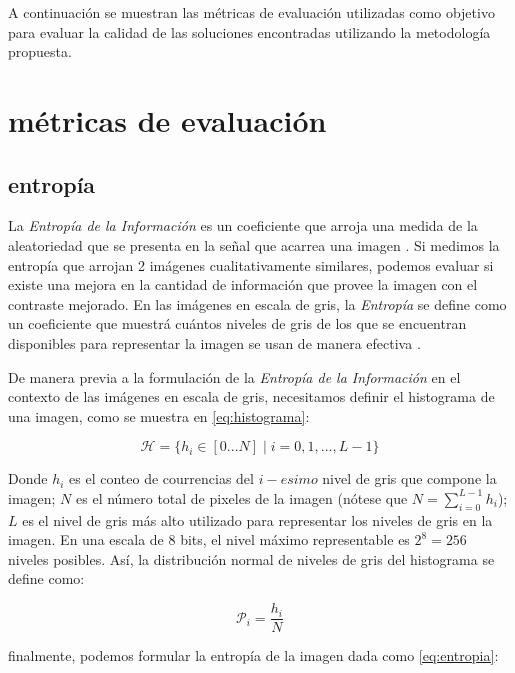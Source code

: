 \documentclass[spanish]{article}
\begin{document}
A continuación se muestran las métricas de evaluación utilizadas como objetivo para evaluar la calidad de las soluciones encontradas utilizando la metodología propuesta.

\section{métricas de evaluación}
\label{sec:metricas}

\subsection{entropía}
\label{ssec:entropia}

La {\it Entropía de la Información} es un coeficiente que arroja una medida de la aleatoriedad que se presenta en la señal que acarrea una imagen \cite{tsai2008information}. Si medimos la entropía que arrojan 2 imágenes cualitativamente similares, podemos evaluar si existe una mejora en la cantidad de información que provee la imagen con el contraste mejorado. En las imágenes en escala de gris, la {\it Entropía} se define como un coeficiente que muestrá cuántos niveles de gris de los que se encuentran disponibles para representar la imagen se usan de manera efectiva \cite{kwok2006intensity}.

De manera previa a la formulación de la {\it Entropía de la Información} en el contexto de las imágenes en escala de gris, necesitamos definir el histograma de una imagen, como se muestra en \eqref{eq:histograma}:

\begin{equation}\label{eq:histograma}
    \mathcal{H}=\{h_i \in [0...N]\mid i=0,1,...,L-1\}
\end{equation}

Donde $h_i$ es el conteo de courrencias del $i-esimo$ nivel de gris que compone la imagen; $N$ es el número total de pixeles de la imagen (nótese que $N=\sum_{i=0}^{L-1}h_i$); $L$ es el nivel de gris más alto utilizado para representar los niveles de gris en la imagen. En una escala de 8 bits, el nivel máximo representable es $2^8=256$ niveles posibles. Así, la distribución normal de niveles de gris del histograma se define como: 

\begin{equation}\label{eq:distribucionormal}
\mathcal{P}_i=\frac{h_i}{N}
\end{equation}

finalmente, podemos formular la entropía de la imagen dada como \eqref{eq:entropia}:
\end{document}
